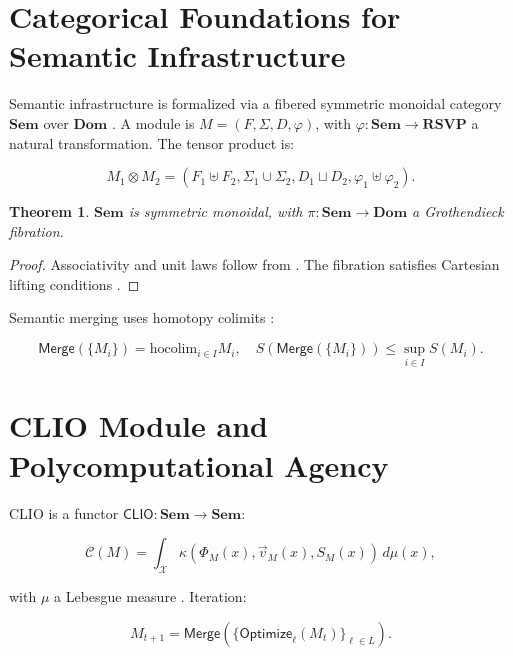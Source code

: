 \documentclass[12pt]{article}
\theoremstyle{plain}
\newtheorem{theorem}{Theorem}
\begin{document}
{{{\section{Categorical Foundations for Semantic Infrastructure}
\label{sec:categorical-foundations}

Semantic infrastructure is formalized via a fibered symmetric monoidal category $ \mathbf{Sem} $ over $ \mathbf{Dom} $ \citep{BaezStay2010}. A module is $ M = (F, \Sigma, D, \varphi) $, with $ \varphi: \mathbf{Sem} \to \mathbf{RSVP} $ a natural transformation. The tensor product is:

\[ M_1 \otimes M_2 = (F_1 \uplus F_2, \Sigma_1 \cup \Sigma_2, D_1 \sqcup D_2, \varphi_1 \uplus \varphi_2). \]

\begin{theorem}
$ \mathbf{Sem} $ is symmetric monoidal, with $ \pi: \mathbf{Sem} \to \mathbf{Dom} $ a Grothendieck fibration.
\end{theorem}

\begin{proof}
Associativity and unit laws follow from \citet{MacLane1998}. The fibration satisfies Cartesian lifting conditions \citep{Lurie2009}.
\end{proof}

Semantic merging uses homotopy colimits \citep{Lurie2009}:

\[ \mathsf{Merge}(\{M_i\}) = \mathrm{hocolim}_{i \in I} M_i, \quad S(\mathsf{Merge}(\{M_i\})) \leq \sup_{i \in I} S(M_i). \]


\section{CLIO Module and Polycomputational Agency}
\label{sec:clio-polyagency}

CLIO is a functor $ \mathsf{CLIO}: \mathbf{Sem} \to \mathbf{Sem} $:

\[ \mathcal{C}(M) = \int_{\mathcal{X}} \kappa(\Phi_M(x), \vec{v}_M(x), S_M(x)) \, d\mu(x), \]

with $ \mu $ a Lebesgue measure \citep{ChengBroadbentChappell2025}. Iteration:

\[ M_{t+1} = \mathsf{Merge}(\{ \mathsf{Optimize}_\ell(M_t) \}_{\ell \in L}). \]

}}}
\end{document}
